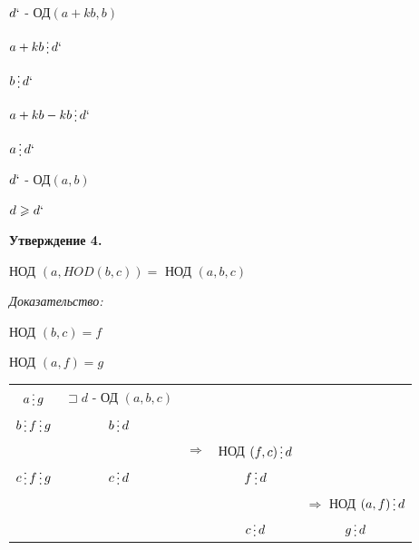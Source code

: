 \documentclass[12pt]{article}
\begin{document}
\begin{enumerate}
          $d`$ - ОД$(a+kb,b)$\par
          $a+kb \mathop{\raisebox{-2pt}{\vdots}} d`$\par
          $b \mathop{\raisebox{-2pt}{\vdots}} d`$\par
          $a +kb-kb \mathop{\raisebox{-2pt}{\vdots}} d`$\par
          $a \mathop{\raisebox{-2pt}{\vdots}} d`$\par
          $d`$ - ОД$(a,b)$\par
          $d \geqslant d`$\par
\end{enumerate}\par

\textbf{Утверждение 4.}\par
НОД $(a, HOD(b,c)) =$ НОД $(a,b,c)$\par
\it{Доказательство:}\par
НОД $(b,c) = f$\par
НОД $(a,f) = g$\par
\begin{tabular}{ccccc}
    $a \mathop{\raisebox{-2pt}{\vdots}} g$                                    & $\sqsupset d$ - ОД $(a,b,c)$                                                                                                                                                                    \\
    $b \mathop{\raisebox{-2pt}{\vdots}} f \mathop{\raisebox{-2pt}{\vdots}} g$ & $b \mathop{\raisebox{-2pt}{\vdots}} d$                                                                                                                                                          \\
                                                                              &                                        & $\Rightarrow$                          & НОД $(f,c) \mathop{\raisebox{-2pt}{\vdots}} d$                                                                \\
    $c \mathop{\raisebox{-2pt}{\vdots}} f \mathop{\raisebox{-2pt}{\vdots}} g$ & $c \mathop{\raisebox{-2pt}{\vdots}} d$
                                                                              &                                        & $f \mathop{\raisebox{-2pt}{\vdots}} d$                                                                                                                 \\
                                                                              &                                        &                                        &                                                & $\Rightarrow$ НОД $(a,f) \mathop{\raisebox{-2pt}{\vdots}} d$ \\
                                                                              &                                        &                                        & $c \mathop{\raisebox{-2pt}{\vdots}} d$         & $g \mathop{\raisebox{-2pt}{\vdots}} d$                       \\
\end{tabular}\par
\end{document}
